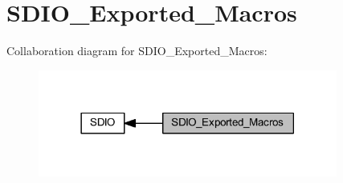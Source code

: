 \hypertarget{group___s_d_i_o___exported___macros}{}\section{S\+D\+I\+O\+\_\+\+Exported\+\_\+\+Macros}
\label{group___s_d_i_o___exported___macros}
Collaboration diagram for S\+D\+I\+O\+\_\+\+Exported\+\_\+\+Macros\+:
\nopagebreak
\begin{figure}[H]
\begin{center}
\leavevmode
\includegraphics[width=278pt]{group___s_d_i_o___exported___macros}
\end{center}
\end{figure}
